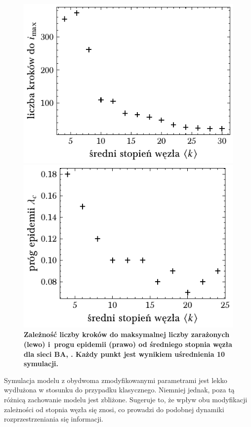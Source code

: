 \documentclass[13pt,a4paper]{article}
\begin{document}
\pagebreak

\begin{figure}[ht!]
	\begin{minipage}[t]{0.49\textwidth}
		\centering
		\includegraphics[width=\textwidth]{../figures/both/ba_tmax_vs_k.pdf}
	\end{minipage}
	\hspace{\fill}
	\begin{minipage}[t]{0.49\textwidth}
		\centering
		\includegraphics[width=\textwidth]{../figures/both/ba_threshold_vs_k.pdf}
	\end{minipage}
	\caption{\centering\textbf{Zależność liczby kroków do maksymalnej liczby zarażonych (lewo) i progu epidemii (prawo) od średniego stopnia węzła dla sieci BA, . Każdy punkt jest wynikiem uśrednienia 10 symulacji.}}
\end{figure}

Symulacja modelu z obydwoma zmodyfikowanymi parametrami jest lekko wydłużona w stosunku do przypadku klasycznego. Niemniej jednak, poza tą różnicą zachowanie modelu jest zbliżone. Sugeruje to, że wpływ obu modyfikacji zależności od stopnia węzła się znosi, co prowadzi do podobnej dynamiki rozprzestrzeniania się informacji.
\end{document}
